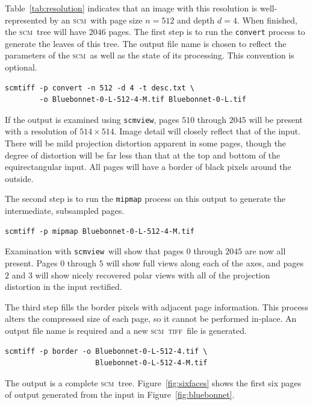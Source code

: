 \documentclass[oneside,10pt]{memoir}
\newcommand{\scm}     {\textsc{scm}}
\newcommand{\tiff}    {\textsc{tiff}}
\newcommand{\scmview} {\texttt{scmview}}
\begin{document}
\begin{Spacing}{1.1}
Table~\ref{tab:resolution} indicates that an image with this resolution is well-represented by an \scm\ with page size $n=512$ and depth $d=4$. When finished, the \scm\ tree will have $2046$ pages. The first step is to run the \texttt{convert} process to generate the leaves of this tree. The output file name is chosen to reflect the parameters of the \scm\ as well as the state of its processing. This convention is optional.

\begin{Verbatim}
scmtiff -p convert -n 512 -d 4 -t desc.txt \
        -o Bluebonnet-0-L-512-4-M.tif Bluebonnet-0-L.tif
\end{Verbatim}

If the output is examined using \scmview, pages $510$ through $2045$ will be present with a resolution of $514\times 514$. Image detail will closely reflect that of the input. There will be mild projection distortion apparent in some pages, though the degree of distortion will be far less than that at the top and bottom of the equirectangular input. All pages will have a border of black pixels around the outside.

The second step is to run the \texttt{mipmap} process on this output to generate the intermediate, subsampled pages.

\begin{Verbatim}
scmtiff -p mipmap Bluebonnet-0-L-512-4-M.tif
\end{Verbatim}

Examination with \scmview\ will show that pages $0$ through $2045$ are now all present. Pages $0$ through $5$ will show full views along each of the axes, and pages $2$ and $3$ will show nicely recovered polar views with all of the projection distortion in the input rectified.

The third step fills the border pixels with adjacent page information. This process alters the compressed size of each page, so it cannot be performed in-place. An output file name is required and a new \scm\ \tiff\ file is generated.

\begin{Verbatim}
scmtiff -p border -o Bluebonnet-0-L-512-4.tif \
                     Bluebonnet-0-L-512-4-M.tif
\end{Verbatim}

The output is a complete \scm\ tree. Figure~\ref{fig:sixfaces} shows the first six pages of output generated from the input in Figure~\ref{fig:bluebonnet}.


\end{Spacing}
\end{document}
